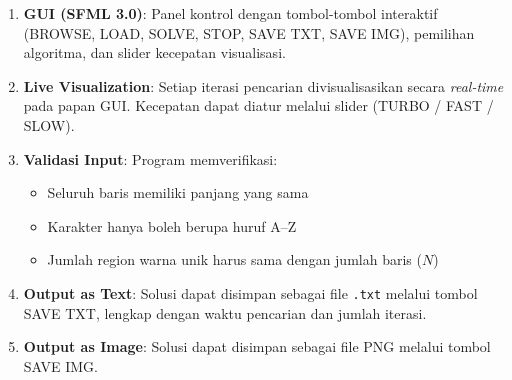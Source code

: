 \begin{enumerate}
    \item \textbf{GUI (SFML 3.0)}: Panel kontrol dengan tombol-tombol interaktif (BROWSE, LOAD, SOLVE, STOP, SAVE TXT, SAVE IMG), pemilihan algoritma, dan slider kecepatan visualisasi.
    \item \textbf{Live Visualization}: Setiap iterasi pencarian divisualisasikan secara \textit{real-time} pada papan GUI. Kecepatan dapat diatur melalui slider (TURBO / FAST / SLOW).
    \item \textbf{Validasi Input}: Program memverifikasi:
    \begin{itemize}
        \item Seluruh baris memiliki panjang yang sama
        \item Karakter hanya boleh berupa huruf A--Z
        \item Jumlah region warna unik harus sama dengan jumlah baris ($N$)
    \end{itemize}
    \item \textbf{Output as Text}: Solusi dapat disimpan sebagai file \texttt{.txt} melalui tombol SAVE TXT, lengkap dengan waktu pencarian dan jumlah iterasi.
    \item \textbf{Output as Image}: Solusi dapat disimpan sebagai file PNG melalui tombol SAVE IMG.
\end{enumerate}
